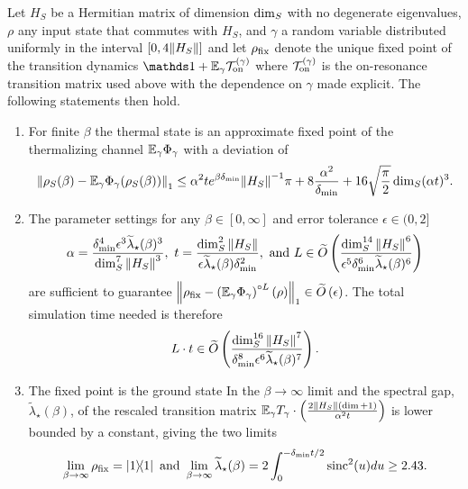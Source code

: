 \begin{theorem} \label{thm:zero_knowledge}
    Let $H_S$ be a Hermitian matrix of dimension ${\rm dim}_S$ with no degenerate eigenvalues, $\rho$ any input state that commutes with $H_S$, and $\gamma$ a random variable distributed uniformly in the interval $[0, 4 \norm{H_S}]$ and
    let $\rho_{\rm fix}$ denote the unique fixed point of the transition dynamics $\identity + \EE_\gamma \TT_{\on}^{(\gamma)}$ where $\mathcal{T}_{\rm on}^{(\gamma)}$ is the on-resonance transition matrix used above with the dependence on $\gamma$ made explicit. The following statements then hold.
    \begin{enumerate}
\item For finite $\beta$ the thermal state is an approximate fixed point of the thermalizing channel $\mathbb{E}_\gamma \Phi_\gamma$ with a deviation of
    \begin{equation}
        \norm{\rho_S(\beta) - \mathbb{E}_\gamma \Phi_\gamma(\rho_S(\beta))}_1 \le \alpha^2 t e^{\beta \delta_{\min}} \norm{H_S}^{-1} \pi + 8 \frac{\alpha^2}{\delta_{\min}} + 16 \sqrt{\frac{\pi}{2}} \dim_S (\alpha t)^3.
    \end{equation}
    \item   The parameter settings for any $\beta\in [0,\infty]$ and error tolerance $\epsilon \in (0,2]$
    \begin{align}
        \alpha = \frac{\delta_{\min}^4 \epsilon^{3} \widetilde{\lambda}_\star(\beta)^{3}}{\dim_S^7 \norm{H_S}^3}, ~t = \frac{\dim_S^2 \norm{H_S}}{\epsilon \widetilde{\lambda}_\star(\beta) \delta_{\min}^2}, \text{ and } L \in \widetilde{O} \left( \frac{\dim_S^{14} \norm{H_S}^6}{\epsilon^5 \delta_{\min}^6 \widetilde{\lambda}_\star(\beta)^{6} } \right)
    \end{align}
    are sufficient to guarantee $\norm{\rho_{\rm fix} - \left(\mathbb{E}_\gamma \Phi_\gamma \right)^{\circ L}(\rho)}_1 \in \widetilde{O} \left( \epsilon \right)$.
    The total simulation time needed is therefore
    \begin{equation}
        L \cdot t \in \widetilde{O} \left( \frac{\dim_S^{16} \norm{H_S}^7}{\delta_{\min}^8 \epsilon^6 \widetilde{\lambda}_\star(\beta)^7} \right).
    \end{equation}
   \item    The fixed point is the ground state In the $\beta \to \infty$ limit and the spectral gap, $\widetilde{\lambda}_\star(\beta)$, of the rescaled transition matrix $\mathbb{E}_\gamma T_\gamma \cdot \left(\frac{2 \norm{H_S} (\dim + 1)}{\alpha^2 t}\right)$ is lower bounded by a constant, giving the two limits
    \begin{equation}
        \lim_{\beta \to \infty} \rho_{\rm fix} = \ketbra{1}{1} \text{ and } \lim_{\beta \to \infty} \widetilde{\lambda}_\star(\beta) = 2 \int_{0}^{-\delta_{\min}t/2} \operatorname{sinc}^2(u) du \ge 2.43.
        \end{equation}

    \end{enumerate}
\end{theorem}
